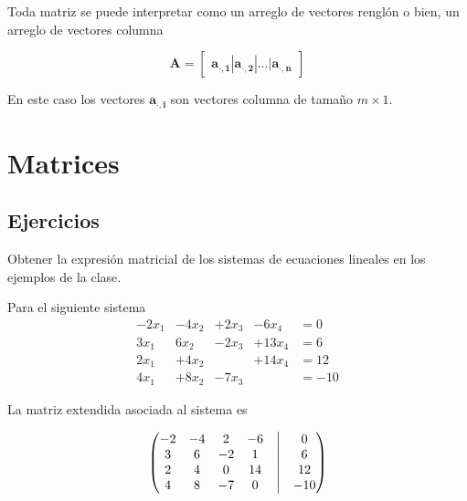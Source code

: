 \documentclass[
]{article}
\begin{document}
Toda matriz se puede interpretar como un arreglo de vectores renglón o
bien, un arreglo de vectores columna

\begin{equation*}
  \mathbf{A} = 
    \begin{bmatrix} \mathbf{a_{\cdot,1}}|\mathbf{a_{\cdot,2}}|\ldots |\mathbf{a_{\cdot,n}} \end{bmatrix}
\end{equation*}

En este caso los vectores \(\mathbf{a_{\cdot,i}}\) son vectores columna
de tamaño \(m\times 1\).

\hypertarget{matrices}{%
\section{\texorpdfstring{\textbf{Matrices}}{Matrices}}\label{matrices}}

\hypertarget{ejercicios}{%
\subsection{Ejercicios}\label{ejercicios}}

\small

Obtener la expresión matricial de los sistemas de ecuaciones lineales en
los ejemplos de la clase.

Para el siguiente sistema \begin{equation*}
  \begin{matrix}
     -2 x_1 & -4 x_2 & +2 x_3 &-6x_4     & = 0  \\
      3 x_1 &  6 x_2  & -2 x_3& +13 x_4  &= 6\\
     2 x_1 &  + 4x_2  &      &  +14 x_4  &=12\\
     4 x_1 & + 8x_2  &-7x_3 &            &= -10
  \end{matrix}
\end{equation*}

La matriz extendida asociada al sistema es

\begin{equation*}
  \begin{pmatrix}
      - 2   & - 4 &   2  & -6 & \bigm| & 0   \\
        3   &   6 & - 2  & 1  & \bigm| & 6    \\
        2   &   4 &   0  & 14 & \bigm| & 12  \\
        4   &   8 &  -7  & 0  & \bigm| & -10
  \end{pmatrix}
\end{equation*}
\end{document}

